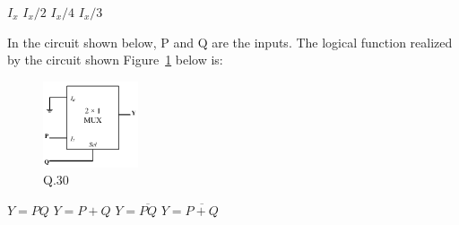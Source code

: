 \documentclass[a4, 12pt, addpoints]{exam}
\begin{document}
\begin{questions}
\begin{oneparchoices}
    \choice $I_x$
    \choice $I_x/2$
    \CorrectChoice $I_x/4$
    \choice $I_x/3$
\end{oneparchoices}

\question In the circuit shown below, P and Q are the inputs. The logical function realized by the circuit shown Figure~\ref{fig:2} below is:
\begin{figure}[H]
\centering
\includegraphics[width=0.25\textwidth]{mux}
\caption{Q.30}
\label{fig:2}
\end{figure}
\begin{oneparchoices}
    \choice $Y = PQ$
    \choice $Y=P+Q$
    \choice $Y = \overline{PQ}$
    \CorrectChoice $Y= \overline{P + Q}$
    
\end{oneparchoices}



\vspace{0.10in}

\end{questions}
\end{document}
